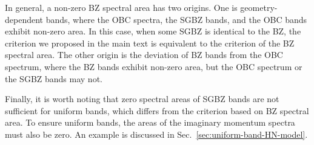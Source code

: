 \documentclass[pdflatex,sn-nature, iicol]{sn-jnl}%
\theoremstyle{thmstyleone}%
\theoremstyle{thmstyletwo}%
\theoremstyle{thmstylethree}%
\begin{document}
In general, a non-zero BZ spectral area has two origins. One is geometry-dependent
bands, where the OBC spectra, the SGBZ bands, and the OBC bands exhibit
non-zero area. In this case, when some SGBZ is identical to the BZ,
the criterion we proposed in the main text is equivalent to the criterion
of the BZ spectral area. The other origin is the deviation of BZ bands
from the OBC spectrum, where the BZ bands exhibit non-zero area, but
the OBC spectrum or the SGBZ bands may not.

Finally, it is worth noting that zero spectral areas of SGBZ bands
are not sufficient for uniform bands, which differs from the criterion
based on BZ spectral area. To ensure uniform bands, the areas of the imaginary momentum spectra
must also be zero. An example is discussed in Sec.~\ref{sec:uniform-band-HN-model}.



% 
\end{document}
